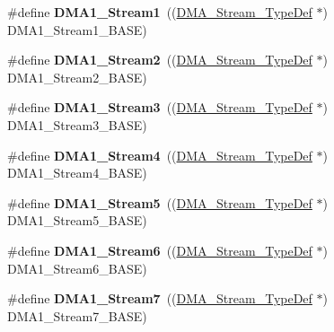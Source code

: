 \begin{DoxyCompactItemize}
\#define {\bfseries D\+M\+A1\+\_\+\+Stream1}~((\mbox{\hyperlink{struct_d_m_a___stream___type_def}{D\+M\+A\+\_\+\+Stream\+\_\+\+Type\+Def}} $\ast$) D\+M\+A1\+\_\+\+Stream1\+\_\+\+B\+A\+SE)
\item 
\mbox{\label{group___peripheral__declaration_gad0e2140b8eeec3594035f1a7bf2a7250}} 
\#define {\bfseries D\+M\+A1\+\_\+\+Stream2}~((\mbox{\hyperlink{struct_d_m_a___stream___type_def}{D\+M\+A\+\_\+\+Stream\+\_\+\+Type\+Def}} $\ast$) D\+M\+A1\+\_\+\+Stream2\+\_\+\+B\+A\+SE)
\item 
\mbox{\label{group___peripheral__declaration_ga96ac1af7a92469fe86a9fbdec091f25d}} 
\#define {\bfseries D\+M\+A1\+\_\+\+Stream3}~((\mbox{\hyperlink{struct_d_m_a___stream___type_def}{D\+M\+A\+\_\+\+Stream\+\_\+\+Type\+Def}} $\ast$) D\+M\+A1\+\_\+\+Stream3\+\_\+\+B\+A\+SE)
\item 
\mbox{\label{group___peripheral__declaration_ga87df45f4b82e0b3a8c1b17f1a77aecdb}} 
\#define {\bfseries D\+M\+A1\+\_\+\+Stream4}~((\mbox{\hyperlink{struct_d_m_a___stream___type_def}{D\+M\+A\+\_\+\+Stream\+\_\+\+Type\+Def}} $\ast$) D\+M\+A1\+\_\+\+Stream4\+\_\+\+B\+A\+SE)
\item 
\mbox{\label{group___peripheral__declaration_gac3abc20f80e25c19b02104ad34eae652}} 
\#define {\bfseries D\+M\+A1\+\_\+\+Stream5}~((\mbox{\hyperlink{struct_d_m_a___stream___type_def}{D\+M\+A\+\_\+\+Stream\+\_\+\+Type\+Def}} $\ast$) D\+M\+A1\+\_\+\+Stream5\+\_\+\+B\+A\+SE)
\item 
\mbox{\label{group___peripheral__declaration_gac95127480470900755953f1cfe68567d}} 
\#define {\bfseries D\+M\+A1\+\_\+\+Stream6}~((\mbox{\hyperlink{struct_d_m_a___stream___type_def}{D\+M\+A\+\_\+\+Stream\+\_\+\+Type\+Def}} $\ast$) D\+M\+A1\+\_\+\+Stream6\+\_\+\+B\+A\+SE)
\item 
\mbox{\label{group___peripheral__declaration_ga8ecdeaf43d0f4207dab1fdb4d7bf8d26}} 
\#define {\bfseries D\+M\+A1\+\_\+\+Stream7}~((\mbox{\hyperlink{struct_d_m_a___stream___type_def}{D\+M\+A\+\_\+\+Stream\+\_\+\+Type\+Def}} $\ast$) D\+M\+A1\+\_\+\+Stream7\+\_\+\+B\+A\+SE)
\item 

\end{DoxyCompactItemize}
